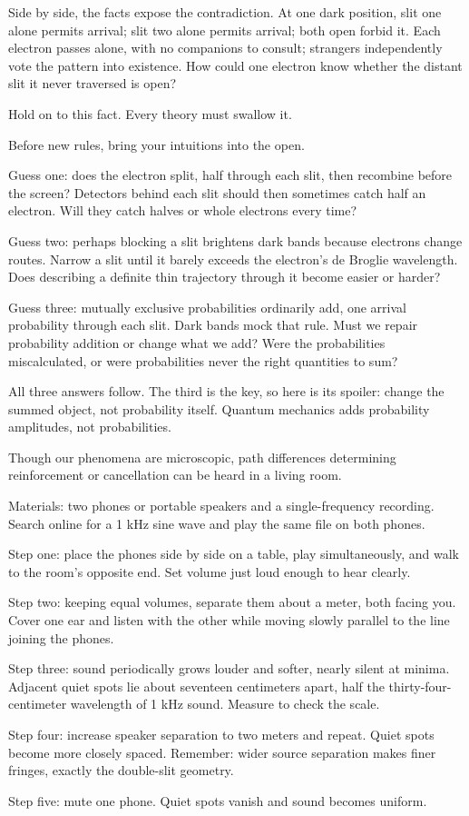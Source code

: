 Side by side, the facts expose the contradiction. At one dark position, slit one alone permits arrival; slit two alone permits arrival; both open forbid it. Each electron passes alone, with no companions to consult; strangers independently vote the pattern into existence. How could one electron know whether the distant slit it never traversed is open?

Hold on to this fact. Every theory must swallow it.


Before new rules, bring your intuitions into the open.

Guess one: does the electron split, half through each slit, then recombine before the screen? Detectors behind each slit should then sometimes catch half an electron. Will they catch halves or whole electrons every time?

Guess two: perhaps blocking a slit brightens dark bands because electrons change routes. Narrow a slit until it barely exceeds the electron's de Broglie wavelength. Does describing a definite thin trajectory through it become easier or harder?

Guess three: mutually exclusive probabilities ordinarily add, one arrival probability through each slit. Dark bands mock that rule. Must we repair probability addition or change what we add? Were the probabilities miscalculated, or were probabilities never the right quantities to sum?

All three answers follow. The third is the key, so here is its spoiler: change the summed object, not probability itself. Quantum mechanics adds probability amplitudes, not probabilities.


Though our phenomena are microscopic, path differences determining reinforcement or cancellation can be heard in a living room.

\begin{experiment}
Materials: two phones or portable speakers and a single-frequency recording. Search online for a 1 kHz sine wave and play the same file on both phones.

Step one: place the phones side by side on a table, play simultaneously, and walk to the room's opposite end. Set volume just loud enough to hear clearly.

Step two: keeping equal volumes, separate them about a meter, both facing you. Cover one ear and listen with the other while moving slowly parallel to the line joining the phones.

Step three: sound periodically grows louder and softer, nearly silent at minima. Adjacent quiet spots lie about seventeen centimeters apart, half the thirty-four-centimeter wavelength of 1 kHz sound. Measure to check the scale.

Step four: increase speaker separation to two meters and repeat. Quiet spots become more closely spaced. Remember: wider source separation makes finer fringes, exactly the double-slit geometry.

Step five: mute one phone. Quiet spots vanish and sound becomes uniform.
\end{experiment}

